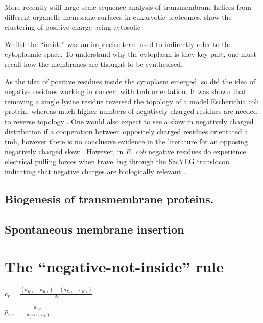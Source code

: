 \documentclass[12pt,PhD,twoside]{muthesis}
\begin{document}
More recently still large scale sequence analysis of transmembrane helices from different organelle membrane surfaces in eukaryotic proteomes, show the clustering of positive charge being cytosolic \cite{Sharpe2010, Baeza-Delgado2013}.

Whilst the ``inside'' was an imprecise term used to indirectly refer to the cytoplasmic space. To understand why the cytoplasm is they key part, one must recall how the membranes are thought to be synthesised.

As the idea of positive residues inside the cytoplasm emerged, so did the idea of negative residues working in concert with \gls{tmh} orientation. It was shown that removing a single lysine residue reversed the topology of a model Escherichia coli protein, whereas much higher numbers of negatively charged residues are needed to reverse topology \cite{Nilsson1990}. One would also expect to see a skew in negatively charged distribution if a cooperation between oppositely charged residues orientated a \gls{tmh}, however there is no conclusive evidence in the literature for an opposing negatively charged skew \cite{Granseth2005, Nilsson2005, Sharpe2010, Baeza-Delgado2013}. However, in {\it E. coli} negative residues do experience electrical pulling forces when travelling through the SecYEG translocon indicating that negative charges are biologically relevant \cite{Ismail2015}.

\section{Biogenesis of transmembrane proteins.}

\section{Spontaneous membrane insertion}

\chapter{The ``negative-not-inside'' rule}



$c_r=\frac{(a_{K,r}+a_{R,r})-(a_{D,r}+a_{E,r})}{N}$

$p_{i,r}=\frac{a_{i,r}}{\underset{r}{\max}{(a_r)}}$
\end{document}
